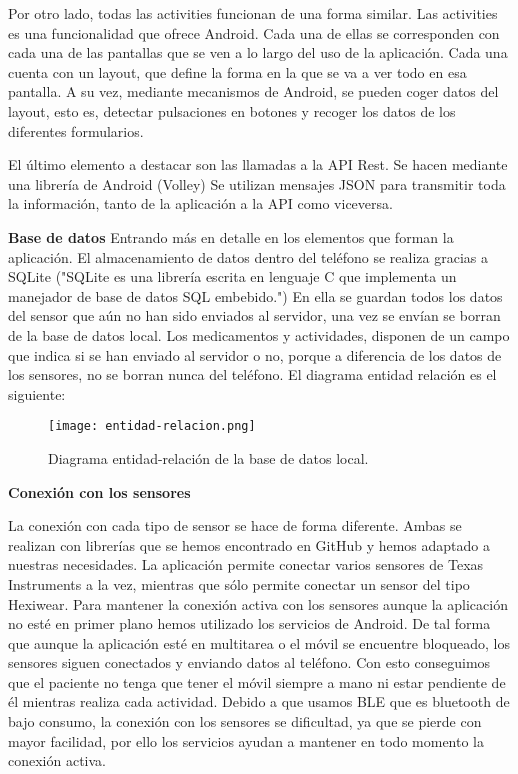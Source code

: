 \documentclass[11pt,spanish]{article}
\begin{document}
Por otro lado, todas las activities funcionan de una forma similar. Las activities es una funcionalidad que ofrece Android. Cada una de ellas se corresponden con cada una de las pantallas que se ven a lo largo del uso de la aplicación. Cada una cuenta con un layout, que define la forma en la que se va a ver todo en esa pantalla. A su vez, mediante mecanismos de Android, se pueden coger datos del layout, esto es, detectar pulsaciones en botones y recoger los datos de los diferentes formularios.
\newline

El último elemento a destacar son las llamadas a la API Rest. Se hacen mediante una librería de Android (Volley) Se utilizan mensajes JSON para transmitir toda la información, tanto de la aplicación a la API como viceversa.
\newline

{\bf Base de datos}
\newline
\newline
Entrando más en detalle en los elementos que forman la aplicación. El almacenamiento de datos dentro del teléfono se realiza gracias a SQLite ("SQLite es una librería escrita en lenguaje C que implementa un manejador de base de datos SQL embebido.") En ella se guardan todos los datos del sensor que aún no han sido enviados al servidor, una vez se envían se borran de la base de datos local. Los medicamentos y actividades,  disponen de un campo que indica si se han enviado al servidor o no, porque a diferencia de los datos de los sensores, no se borran nunca del teléfono. El diagrama entidad relación es el siguiente:
\newline

\begin{figure}[h!]
\centering
\texttt{[image: entidad-relacion.png]}
\caption{Diagrama entidad-relación de la base de datos local.}
\end{figure}
\newpage

{\bf Conexión con los sensores}
\newline
\newline

La conexión con cada tipo de sensor se hace de forma diferente. Ambas se realizan con librerías que se hemos encontrado en GitHub \cite{github_ble} y hemos adaptado a nuestras necesidades. La aplicación permite conectar varios sensores de Texas Instruments a la vez, mientras que sólo permite conectar un sensor del tipo Hexiwear. Para mantener la conexión activa con los sensores aunque la aplicación no esté en primer plano hemos utilizado los servicios de Android. De tal forma que aunque la aplicación esté en multitarea o el móvil se encuentre bloqueado, los sensores siguen conectados y enviando datos al teléfono. Con esto conseguimos que el paciente no tenga que tener el móvil siempre a mano ni estar pendiente de él mientras realiza cada actividad. Debido a que usamos BLE que es bluetooth de bajo consumo, la conexión con los sensores se dificultad, ya que se pierde con mayor facilidad, por ello los servicios ayudan a mantener en todo momento la conexión activa.
\newpage
\end{document}
